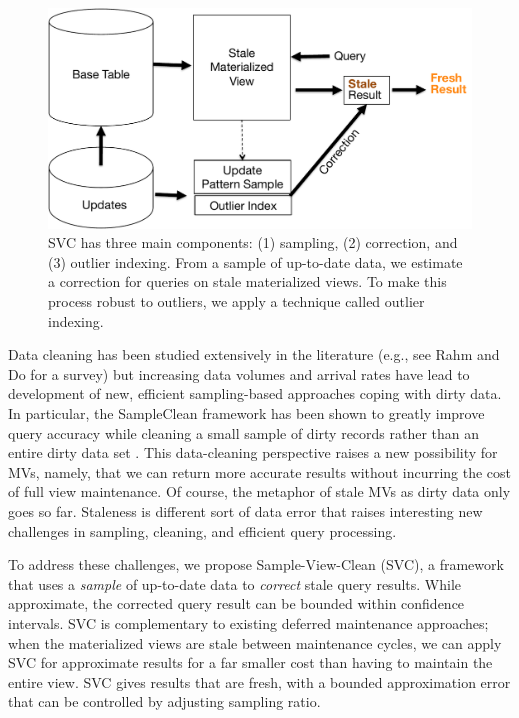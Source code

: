 \begin{figure}[t] %
\centering
 \includegraphics[scale=0.30]{figs/sys-arch.pdf}
 \caption{SVC has three main components: (1) sampling, (2) correction, and (3) outlier indexing. From a sample of up-to-date data, we estimate
 a correction for queries on stale materialized views. To make this process robust to outliers, we apply a technique called outlier indexing. \label{sys-arch}}\vspace{-1.5em}
\end{figure}

Data cleaning has been studied extensively in the literature (e.g., see Rahm and Do for a survey\cite{rahm2000data}) but increasing data volumes and arrival rates have lead to development of new, efficient sampling-based approaches coping with dirty data.   In particular, the SampleClean framework has been shown to greatly improve query accuracy while cleaning a small sample of dirty records rather than an entire dirty data set \cite{wang1999sample}.  This data-cleaning perspective raises a new possibility for MVs, namely, that we can return more accurate results without incurring the cost of full view maintenance.   Of course, the metaphor of stale MVs as dirty data only goes so far. Staleness is different sort of data error that raises interesting new challenges in sampling, cleaning, and efficient query processing.

To address these challenges, we propose Sample-View-Clean (SVC), a framework that uses a \emph{sample} of up-to-date data to \emph{correct} stale query results.  While approximate, the corrected query result can be bounded within confidence intervals.
SVC is complementary to existing deferred maintenance approaches; when the materialized views are stale between maintenance cycles, we can apply SVC for approximate results for a far smaller cost than having to maintain the entire view.
SVC gives results that are fresh, with a bounded approximation error that can be controlled by adjusting sampling ratio.


